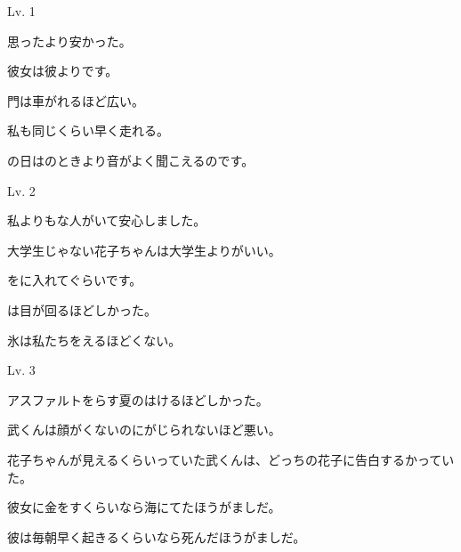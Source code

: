 
\author{Tomislav Mamić}

	
	
	\begin{mondai}{Lv. 1}
		\Large
		\item 思ったより安かった。
		\item 彼女は彼よりです。
		\item 門は車がれるほど広い。
		\item 私も同じくらい早く走れる。
		\item {}の日はのときより音がよく聞こえるのです。
	\end{mondai}

	\begin{mondai}{Lv. 2}
		\Large
		\item 私よりもな人がいて安心しました。
		\item 大学生じゃない花子ちゃんは大学生よりがいい。
		\item {}をに入れてぐらいです。
		\item {}は目が回るほどしかった。
		\item 氷は私たちをえるほどくない。
	\end{mondai}

	\begin{mondai}{Lv. 3}
		\Large
		\item アスファルトをらす夏のはけるほどしかった。
		\item 武くんは顔がくないのにがじられないほど悪い。
		\item 花子ちゃんが見えるくらいっていた武くんは、どっちの花子に告白するかっていた。
		\item *彼女に金をすくらいなら海にてたほうがましだ。
		\item *彼は毎朝早く起きるくらいなら死んだほうがましだ。
	\end{mondai}
